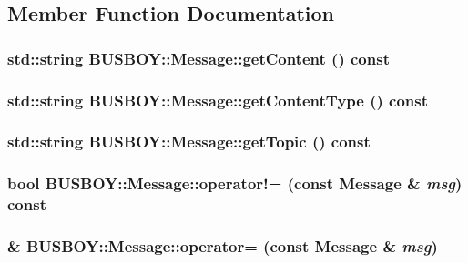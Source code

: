 \subsection{Member Function Documentation}
\hypertarget{classBUSBOY_1_1Message_a9b95e16e29513c76a19ca90adadf9f37}{
\subsubsection[{getContent}]{\setlength{\rightskip}{0pt plus 5cm}std::string BUSBOY::Message::getContent () const}}
\label{classBUSBOY_1_1Message_a9b95e16e29513c76a19ca90adadf9f37}
\hypertarget{classBUSBOY_1_1Message_ac01b481064561c79e0f1bb65b874275d}{
\subsubsection[{getContentType}]{\setlength{\rightskip}{0pt plus 5cm}std::string BUSBOY::Message::getContentType () const}}
\label{classBUSBOY_1_1Message_ac01b481064561c79e0f1bb65b874275d}
\hypertarget{classBUSBOY_1_1Message_a1093e23545abce1e47aba096d2264272}{
\subsubsection[{getTopic}]{\setlength{\rightskip}{0pt plus 5cm}std::string BUSBOY::Message::getTopic () const}}
\label{classBUSBOY_1_1Message_a1093e23545abce1e47aba096d2264272}
\hypertarget{classBUSBOY_1_1Message_a9196bb4e88129511e0e77b0f57a85494}{
\subsubsection[{operator!=}]{\setlength{\rightskip}{0pt plus 5cm}bool BUSBOY::Message::operator!= (const {\bf Message} \& {\em msg}) const}}
\label{classBUSBOY_1_1Message_a9196bb4e88129511e0e77b0f57a85494}
\hypertarget{classBUSBOY_1_1Message_aa88bb972d6ced3dc18b1baf3818b6b2e}{
\subsubsection[{operator=}]{ \& BUSBOY::Message::operator= (const {\bf Message} \& {\em msg})}}
